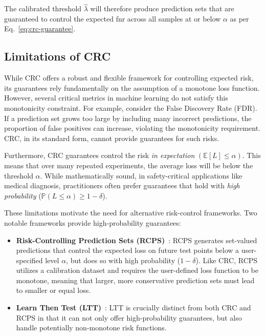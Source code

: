 The calibrated threshold \(\hat{\lambda}\) will therefore produce prediction sets
that are guaranteed to control the expected \gls{fnr} across all samples at or below \(\alpha\)
as per Eq.~\ref{eq:crc-guarantee}.

\subsection{Limitations of CRC}

While CRC offers a robust and flexible framework for controlling expected risk,
its guarantees rely fundamentally on the assumption of a monotone loss function.
However, several critical metrics in machine learning do not satisfy this monotonicity constraint.
For example, consider the False Discovery Rate (FDR).
If a prediction set grows too large by including many incorrect predictions,
the proportion of false positives can increase,
violating the monotonicity requirement.
CRC, in its standard form, cannot provide guarantees for such risks.

Furthermore, CRC guarantees control the risk \emph{in expectation} \((\mathbb{E}[L] \le \alpha)\).
This means that over many repeated experiments,
the average loss will be below the threshold \(\alpha\).
While mathematically sound, in safety-critical applications like medical diagnosis,
practitioners often prefer guarantees that hold with \emph{high probability}
(\(\mathbb{P}(L \le \alpha) \ge 1 - \delta\)).

These limitations motivate the need for alternative risk-control frameworks.
Two notable frameworks provide high-probability guarantees:

\begin{itemize}
    \item \textbf{Risk-Controlling Prediction Sets (RCPS)}~\cite{bates2021rcps}:
    RCPS generates set-valued predictions that control the expected loss
    on future test points below a user-specified level \(\alpha\),
    but does so with high probability (\(1-\delta\)).
    Like CRC, RCPS utilizes a calibration dataset and
    requires the user-defined loss function to be monotone,
    meaning that larger, more conservative prediction sets
    must lead to smaller or equal loss.

    \item \textbf{Learn Then Test (LTT)}~\cite{angelopoulos2022ltt}:
    LTT is crucially distinct from both CRC and RCPS
    in that it can not only offer high-probability guarantees,
    but also handle potentially non-monotone risk functions.
\end{itemize}

